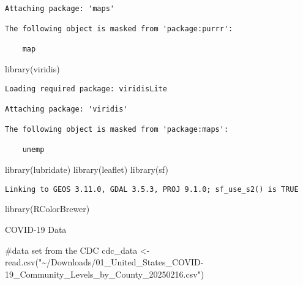 \documentclass[
  letterpaper,
  DIV=11,
  numbers=noendperiod]{scrartcl}
\newenvironment{Shaded}{\begin{snugshade}}{\end{snugshade}}
\newcommand{\CommentTok}[1]{\textcolor[rgb]{0.37,0.37,0.37}{#1}}
\newcommand{\FunctionTok}[1]{\textcolor[rgb]{0.28,0.35,0.67}{#1}}
\newcommand{\NormalTok}[1]{\textcolor[rgb]{0.00,0.23,0.31}{#1}}
\newcommand{\OtherTok}[1]{\textcolor[rgb]{0.00,0.23,0.31}{#1}}
\newcommand{\StringTok}[1]{\textcolor[rgb]{0.13,0.47,0.30}{#1}}
\begin{document}
\begin{verbatim}

Attaching package: 'maps'

The following object is masked from 'package:purrr':

    map
\end{verbatim}

\begin{Shaded}
\begin{Highlighting}[]
\FunctionTok{library}\NormalTok{(viridis)}
\end{Highlighting}
\end{Shaded}

\begin{verbatim}
Loading required package: viridisLite

Attaching package: 'viridis'

The following object is masked from 'package:maps':

    unemp
\end{verbatim}

\begin{Shaded}
\begin{Highlighting}[]
\FunctionTok{library}\NormalTok{(lubridate)}
\FunctionTok{library}\NormalTok{(leaflet)}
\FunctionTok{library}\NormalTok{(sf)}
\end{Highlighting}
\end{Shaded}

\begin{verbatim}
Linking to GEOS 3.11.0, GDAL 3.5.3, PROJ 9.1.0; sf_use_s2() is TRUE
\end{verbatim}

\begin{Shaded}
\begin{Highlighting}[]
\FunctionTok{library}\NormalTok{(RColorBrewer)}
\end{Highlighting}
\end{Shaded}

COVID-19 Data

\begin{Shaded}
\begin{Highlighting}[]
\CommentTok{\#data set from the CDC}
\NormalTok{cdc\_data }\OtherTok{\textless{}{-}} \FunctionTok{read.csv}\NormalTok{(}\StringTok{"\textasciitilde{}/Downloads/01\_United\_States\_COVID{-}19\_Community\_Levels\_by\_County\_20250216.csv"}\NormalTok{)}
\end{Highlighting}
\end{Shaded}
\end{document}
